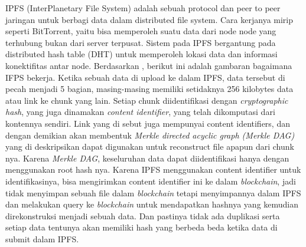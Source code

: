 IPFS (InterPlanetary File System) adalah sebuah protocol dan
peer to peer jaringan untuk berbagi data dalam distributed file system. Cara kerjanya mirip seperti BitTorrent, yaitu bisa memperoleh
suatu data dari node node yang terhubung bukan dari server terpusat. Sistem pada IPFS bergantung pada distributed hash table
(DHT) untuk memperoleh lokasi data dan informasi konektifitas
antar node. Berdasarkan \parencite{Steichen2018}, berikut ini adalah gambaran bagaimana
IFPS bekerja. Ketika sebuah data di upload ke dalam IPFS, data tersebut
di pecah menjadi 5 bagian, masing-masing memiliki setidaknya
256 kilobytes data atau link ke chunk yang lain. Setiap chunk
diidentifikasi dengan \emph{cryptographic hash}, yang juga dinamakan \emph{content
    identifier}, yang telah dikomputasi dari kontennya sendiri. Link yang
di sebut juga mempunyai content identifiers, dan dengan demikian
akan membentuk \emph{Merkle directed acyclic graph (Merkle DAG)} yang
di deskripsikan dapat digunakan untuk reconstruct file apapun dari
chunk nya. Karena \emph{Merkle DAG}, keseluruhan data dapat
diidentifikasi hanya dengan menggunakan root hash nya. Karena IPFS
menggunakan content identifier untuk identifikasinya, bisa
mengirimkan content identifier ini ke dalam \emph{blockchain}, jadi tidak
menyimpan sebuah file dalam \emph{blockchain} tetapi menyimpannya dalam
IPFS dan melakukan query ke \emph{blockchain} untuk mendapatkan
hashnya yang kemudian direkonstruksi menjadi sebuah data. Dan
pastinya tidak ada duplikasi serta setiap data tentunya akan memiliki
hash yang berbeda beda ketika data di submit dalam IPFS.
